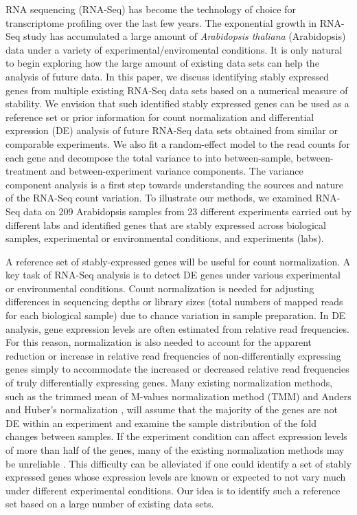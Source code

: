 \documentclass[letterpaper,12pt]{article}
\begin{document}
RNA sequencing (RNA-Seq) has become the technology of choice for transcriptome
profiling over the last few years. The exponential growth in RNA-Seq study has
accumulated a large amount of \textit{Arabidopsis thaliana} (Arabidopsis) data under a variety of
experimental/enviromental conditions.  It is only natural to begin exploring
how the large amount of existing data sets can help the analysis of future
data.  In this paper, we discuss identifying stably expressed genes from
multiple existing RNA-Seq data sets based on a numerical measure of stability.
We envision that such identified stably expressed genes can be used as a
reference set or prior information for count normalization and differential
expression (DE) analysis of future RNA-Seq data sets obtained from similar or
comparable experiments.  We also fit a random-effect model to the read counts
for each gene and decompose the total variance to into between-sample,
between-treatment and between-experiment variance components. The variance component
analysis is a first step towards understanding the sources and nature of the
RNA-Seq count variation.  To illustrate our methods, we examined RNA-Seq data
on 209 Arabidopsis  samples from 23 different experiments carried out by
different labs and identified genes that are stably expressed across
biological samples, experimental or environmental conditions, and experiments
(labs).  

A reference set of stably-expressed genes will be useful for count
normalization.  A key task of RNA-Seq analysis is to detect DE genes under
various experimental or environmental conditions. Count normalization is
needed for adjusting differences in sequencing depths or library sizes (total
numbers of mapped reads for each biological sample) due to chance variation in
sample preparation.  In DE analysis, gene expression levels are often
estimated from relative read frequencies. For this reason, normalization is
also needed to account for the apparent reduction or increase in relative read
frequencies of non-differentially expressing genes simply to accommodate the
increased or decreased relative read frequencies of truly differentially
expressing genes.  Many existing normalization methods, such as the trimmed
mean of M-values normalization method (TMM) \citep{robinson2010scaling} and
Anders and Huber's normalization \citep{anders2010differential}, will  assume that the
majority of the genes are not DE within an experiment and examine the sample
distribution of the fold changes between samples.
If the experiment condition can affect expression levels of more than half of
the genes, many of the existing normalization methods may be unreliable
\citep{loven2012revisiting, wu2013use}.  This difficulty can be
alleviated if one could identify a set of stably expressed genes whose
expression levels are known or expected to not vary much under different
experimental conditions. Our idea is to identify such a reference set based on
a large number of existing data sets.
\end{document}
